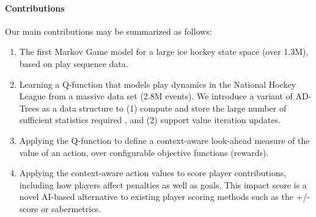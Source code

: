 \documentclass[]{article}
\begin{document}

\paragraph{Contributions}

Our main contributions may be summarized as follows:

\begin{enumerate}
\item The first Markov Game model for a large ice hockey state space (over 1.3M), based on play sequence data. %
\item Learning a Q-function that models play dynamics in the National Hockey League from a massive data set (2.8M events). We introduce a variant of AD-Trees as a data structure to (1) compute and store the large number of sufficient statistics required \citep{Moore1998}, and (2) support value iteration updates.
\item Applying the Q-function to define a context-aware look-ahead measure of the value of an action, over configurable objective functions (rewards).
\item Applying the context-aware action values to score  player contributions, including how players affect penalties as well as goals. This impact score is a novel
AI-based alternative to existing player scoring methods such as the +/- score or sabermetrics.
\end{enumerate}

\end{document}
